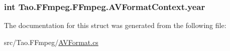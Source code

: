\label{struct_tao_1_1_f_fmpeg_1_1_f_fmpeg_1_1_a_v_format_context_a6eab37f64726db2dd3501676a4887a8b}
\hypertarget{struct_tao_1_1_f_fmpeg_1_1_f_fmpeg_1_1_a_v_format_context_af4d85e07b53e710bab187f647491f711}{
\subsubsection[{year}]{\setlength{\rightskip}{0pt plus 5cm}int {\bf Tao.FFmpeg.FFmpeg.AVFormatContext.year}}}
\label{struct_tao_1_1_f_fmpeg_1_1_f_fmpeg_1_1_a_v_format_context_af4d85e07b53e710bab187f647491f711}


The documentation for this struct was generated from the following file:\begin{DoxyCompactItemize}
\item 
src/Tao.FFmpeg/\hyperlink{_a_v_format_8cs}{AVFormat.cs}\end{DoxyCompactItemize}
